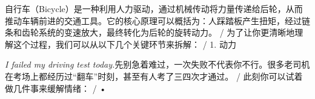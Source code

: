 \begin{multicols}{2}
自\allowbreak{}行\allowbreak{}车\allowbreak{}（\allowbreak{}Bicycl\allowbreak{}e）\allowbreak{}是\allowbreak{}一\allowbreak{}种\allowbreak{}利\allowbreak{}用\allowbreak{}人\allowbreak{}力\allowbreak{}驱\allowbreak{}\allowbreak{}动\allowbreak{}，\allowbreak{}通\allowbreak{}过\allowbreak{}机\allowbreak{}械\allowbreak{}传\allowbreak{}动\allowbreak{}将\allowbreak{}力\allowbreak{}\allowbreak{}量\allowbreak{}传\allowbreak{}递\allowbreak{}给\allowbreak{}后\allowbreak{}轮\allowbreak{}，\allowbreak{}从\allowbreak{}而\allowbreak{}推\allowbreak{}\allowbreak{}动\allowbreak{}车\allowbreak{}辆\allowbreak{}前\allowbreak{}进\allowbreak{}的\allowbreak{}交\allowbreak{}通\allowbreak{}工\allowbreak{}具\allowbreak{}\allowbreak{}。\allowbreak{}它\allowbreak{}的\allowbreak{}核\allowbreak{}心\allowbreak{}原\allowbreak{}理\allowbreak{}可\allowbreak{}以\allowbreak{}概\allowbreak{}\allowbreak{}括\allowbreak{}为\allowbreak{}：\allowbreak{}人\allowbreak{}踩\allowbreak{}踏\allowbreak{}板\allowbreak{}产\allowbreak{}生\allowbreak{}扭\allowbreak{}\allowbreak{}矩\allowbreak{}，\allowbreak{}经\allowbreak{}过\allowbreak{}链\allowbreak{}条\allowbreak{}和\allowbreak{}齿\allowbreak{}轮\allowbreak{}系\allowbreak{}\allowbreak{}统\allowbreak{}的\allowbreak{}变\allowbreak{}速\allowbreak{}放\allowbreak{}大\allowbreak{}，\allowbreak{}最\allowbreak{}终\allowbreak{}转\allowbreak{}\allowbreak{}化\allowbreak{}为\allowbreak{}后\allowbreak{}轮\allowbreak{}的\allowbreak{}旋\allowbreak{}转\allowbreak{}动\allowbreak{}力\allowbreak{}。\allowbreak{} / 为\allowbreak{}了\allowbreak{}让\allowbreak{}你\allowbreak{}更\allowbreak{}清\allowbreak{}晰\allowbreak{}地\allowbreak{}理\allowbreak{}解\allowbreak{}\allowbreak{}这\allowbreak{}个\allowbreak{}过\allowbreak{}程\allowbreak{}，\allowbreak{}我\allowbreak{}们\allowbreak{}可\allowbreak{}以\allowbreak{}从\allowbreak{}\allowbreak{}以\allowbreak{}下\allowbreak{}几\allowbreak{}个\allowbreak{}关\allowbreak{}键\allowbreak{}环\allowbreak{}节\allowbreak{}来\allowbreak{}拆\allowbreak{}\allowbreak{}解\allowbreak{}：\allowbreak{} / 1. 动\allowbreak{}力\allowbreak{}\par\noindent\textit{I failed my driving test today.}\enspace 先\allowbreak{}别\allowbreak{}急\allowbreak{}着\allowbreak{}难\allowbreak{}过\allowbreak{}，\allowbreak{}一\allowbreak{}次\allowbreak{}失\allowbreak{}\allowbreak{}败\allowbreak{}不\allowbreak{}代\allowbreak{}表\allowbreak{}你\allowbreak{}不\allowbreak{}行\allowbreak{}。\allowbreak{}很\allowbreak{}多\allowbreak{}\allowbreak{}老\allowbreak{}司\allowbreak{}机\allowbreak{}在\allowbreak{}考\allowbreak{}场\allowbreak{}上\allowbreak{}都\allowbreak{}经\allowbreak{}历\allowbreak{}\allowbreak{}过\allowbreak{}“翻\allowbreak{}车\allowbreak{}”时\allowbreak{}刻\allowbreak{}，\allowbreak{}甚\allowbreak{}至\allowbreak{}\allowbreak{}有\allowbreak{}人\allowbreak{}考\allowbreak{}了\allowbreak{}三\allowbreak{}四\allowbreak{}次\allowbreak{}才\allowbreak{}通\allowbreak{}过\allowbreak{}\allowbreak{}。\allowbreak{} / 此\allowbreak{}刻\allowbreak{}你\allowbreak{}可\allowbreak{}以\allowbreak{}试\allowbreak{}着\allowbreak{}做\allowbreak{}几\allowbreak{}件\allowbreak{}事\allowbreak{}来\allowbreak{}缓\allowbreak{}解\allowbreak{}情\allowbreak{}绪\allowbreak{}：\allowbreak{} / • 
\end{multicols}
